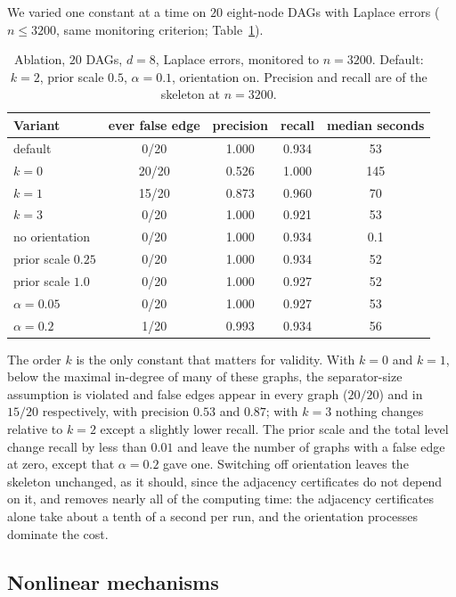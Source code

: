 We varied one constant at a time on $20$ eight-node DAGs with Laplace errors
($n\le3200$, same monitoring criterion; Table~\ref{tab:ablation}).

\begin{table}[t]
\caption{Ablation, $20$ DAGs, $d=8$, Laplace errors, monitored to
$n=3200$. Default: $k=2$, prior scale $0.5$, $\alpha=0.1$, orientation on.
Precision and recall are of the skeleton at $n=3200$.}\label{tab:ablation}
\small
\begin{tabular}{@{}lcccc@{}}
\toprule
Variant & ever false edge & precision & recall & median seconds\\
\midrule
default & 0/20 & 1.000 & 0.934 & 53\\
$k=0$ & 20/20 & 0.526 & 1.000 & 145\\
$k=1$ & 15/20 & 0.873 & 0.960 & 70\\
$k=3$ & 0/20 & 1.000 & 0.921 & 53\\
no orientation & 0/20 & 1.000 & 0.934 & 0.1\\
prior scale $0.25$ & 0/20 & 1.000 & 0.934 & 52\\
prior scale $1.0$ & 0/20 & 1.000 & 0.927 & 52\\
$\alpha=0.05$ & 0/20 & 1.000 & 0.927 & 53\\
$\alpha=0.2$ & 1/20 & 0.993 & 0.934 & 56\\
\bottomrule
\end{tabular}
\end{table}

The order $k$ is the only constant that matters for validity. With $k=0$ and
$k=1$, below the maximal in-degree of many of these graphs, the separator-size
assumption is violated and false edges appear in every graph ($20/20$) and in
$15/20$ respectively, with precision $0.53$ and $0.87$; with $k=3$ nothing
changes relative to $k=2$ except a slightly lower recall. The prior scale and the
total level change recall by less than $0.01$ and leave the number of graphs
with a false edge at zero, except that $\alpha=0.2$ gave one. Switching off
orientation leaves the skeleton unchanged, as it should, since the adjacency
certificates do not depend on it, and removes nearly all of the computing time:
the adjacency certificates alone take about a tenth of a second per run, and the
orientation processes dominate the cost.

\subsection{Nonlinear mechanisms}\label{sec:exp-nonlinear}

